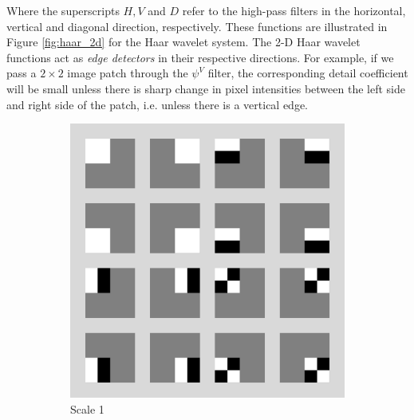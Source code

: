 Where the superscripts $H,V$ and $D$ refer to the high-pass filters in the horizontal, vertical and diagonal direction, respectively.
These functions are illustrated in Figure \ref{fig:haar_2d} for the Haar wavelet system.
The 2-D Haar wavelet functions act as \emph{edge detectors} in their respective directions.
For example, if we pass a $2\times 2$ image patch through the $\psi^V$ filter, the corresponding detail coefficient will be small unless there is sharp change in pixel intensities between the left side and right side of the patch, i.e. unless there is a vertical edge.

\begin{figure}
\centering
\begin{subfigure}{0.4\textwidth}
  \includegraphics[width=\textwidth]{Chapter3/Images/haar2_scale1.png}
  \caption{Scale 1}
\end{subfigure}
\begin{subfigure}{0.4\textwidth}

\end{subfigure}
\end{figure}
